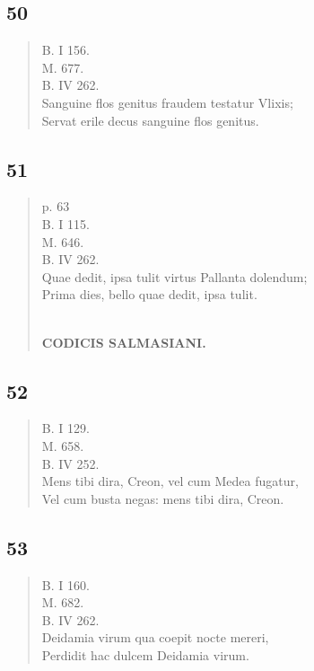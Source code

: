 \documentclass[11pt, a4paper]{report}
\begin{document}
            \subsection*{50}
      \begin{verse}
      B. I 156. \\ M. 677. \\ B. IV 262. \\ Sanguine flos genitus fraudem testatur Vlixis; \\ Servat erile decus sanguine flos genitus. \\ 
      \end{verse}
  
            \subsection*{51}
      \begin{verse}
      p. 63 \\ B. I 115. \\ M. 646. \\ B. IV 262. \\ Quae dedit, ipsa tulit virtus Pallanta dolendum; \\ Prima dies, bello quae dedit, ipsa tulit. \\ 
        ﻿\pagebreak 
    \begin{center} \textbf{CODICIS SALMASIANI.} \end{center} \marginpar{[105]} 
      \end{verse}
  
            \subsection*{52}
      \begin{verse}
      B. I 129. \\ M. 658. \\ B. IV 252. \\ Mens tibi dira, Creon, vel cum Medea fugatur, \\ Vel cum busta negas: mens tibi dira, Creon. \\ 
      \end{verse}
  
            \subsection*{53}
      \begin{verse}
      B. I 160. \\ M. 682. \\ B. IV 262. \\ Deidamia virum qua coepit nocte mereri, \\ Perdidit hac dulcem Deidamia virum. \\ 
      \end{verse}
  
\end{document}
